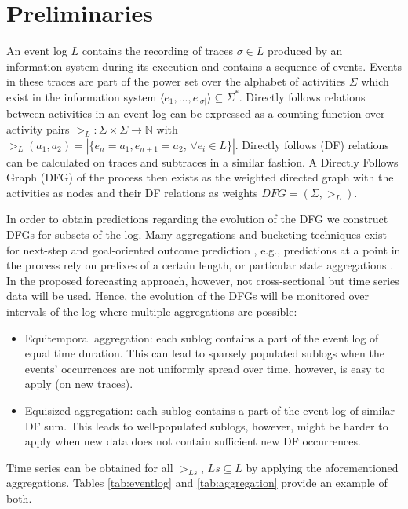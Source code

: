 \section{Preliminaries}\label{sec:preliminaries}

An event log $L$ contains the recording of traces $\sigma \in L$ produced by an information system during its execution and contains a sequence of events.
Events in these traces are part of the power set over the alphabet of activities $\Sigma$ which exist in the information system $\langle e_1,...,e_{|\sigma|}\rangle \subseteq \Sigma^*$.
Directly follows relations between activities in an event log can be expressed as a counting function over activity pairs $>_L: \Sigma\times\Sigma \to \mathbb{N}$ with $>_L(a_1,a_2) = |\{e_n=a_1,e_{n+1}=a_2, \,\forall e_i\in L\}|$.
Directly follows (DF) relations can be calculated on traces and subtraces in a similar fashion.
A Directly Follows Graph (DFG) of the process then exists as the weighted directed graph with the activities as nodes and their DF relations as weights $DFG=(\Sigma,>_L)$.

In order to obtain predictions regarding the evolution of the DFG we construct DFGs for subsets of the log.
Many aggregations and bucketing techniques exist for next-step and goal-oriented outcome prediction \cite{DBLP:conf/caise/TaxVRD17,DBLP:journals/tkdd/TeinemaaDRM19}, e.g., predictions at a point in the process rely on prefixes of a certain length, or particular state aggregations \cite{DBLP:journals/sosym/AalstRVDKG10}.
In the proposed forecasting approach, however, not cross-sectional but time series data will be used.
Hence, the evolution of the DFGs will be monitored over intervals of the log where multiple aggregations are possible:
\begin{itemize}
	\item Equitemporal aggregation: each sublog contains a part of the event log of equal time duration. This can lead to sparsely populated sublogs when the events' occurrences are not uniformly spread over time, however, is easy to apply (on new traces).
	\item Equisized aggregation: each sublog contains a part of the event log of similar DF sum. This leads to well-populated sublogs, however, might be harder to apply when new data does not contain sufficient new DF occurrences.
\end{itemize}
Time series can be obtained for all $>_{Ls},\, Ls\subseteq L$ by applying the aforementioned aggregations.
Tables \ref{tab:eventlog} and \ref{tab:aggregation} provide an example of both.


